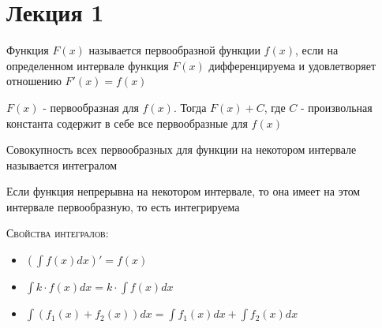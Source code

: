 \chapter{Лекция 1}
    \begin{definition}
        Функция $F(x)$ называется первообразной функции $f(x)$, если на определенном интервале функция $F(x)$ дифференцируема и удовлетворяет отношению $F'(x) = f(x)$
    \end{definition}

    \begin{theorem}
        $F(x)$ - первообразная для $f(x)$. Тогда $F(x) + C$, где $C$ - произвольная константа содержит в себе все первообразные для $f(x)$
    \end{theorem}

    \begin{definition}
        Совокупность всех первообразных для функции на некотором интервале называется интегралом
    \end{definition}

    \begin{theorem}
        Если функция непрерывна на некотором интервале, то она имеет на этом интервале первообразную, то есть интегрируема
    \end{theorem}

    \textsc{Свойства интегралов:}

    \begin{itemize}
        \item $(\int f(x) dx)' = f(x)$
        \item $\int k \cdot f(x) dx = k \cdot \int f(x) dx$ 
        \item $\int (f_1(x) + f_2(x)) dx = \int f_1(x) dx + \int f_2(x) dx$
    \end{itemize}